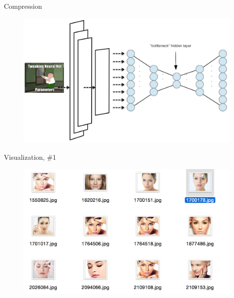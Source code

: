 \documentclass{beamer}
\begin{document}
\begin{frame}{Compression}

\begin{figure}[h!]
  \centering
  \includegraphics[width=1\textwidth]{images/vgg_transfer_sh.png}
\end{figure}

\end{frame}


\begin{frame}{Visualization, \#1}

\begin{figure}[h!]
  \centering
  \includegraphics[width=1\textwidth]{images/search1.png}
\end{figure}

\end{frame}
\end{document}
